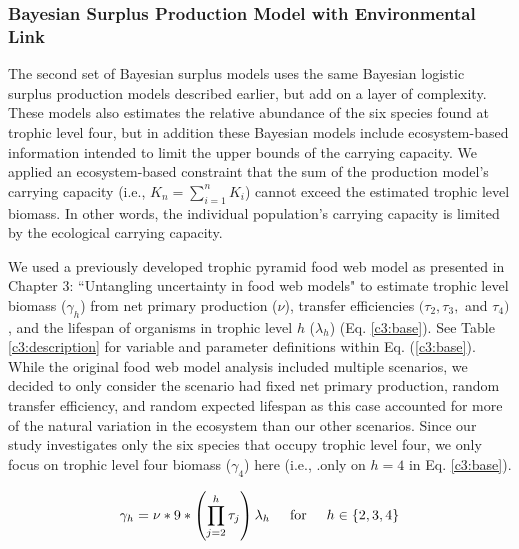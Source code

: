 \documentclass[oneside,12pt,final]{sty/ucthesis-CA2012}
\begin{document}
\begin{mainmatter}
\subsubsection{Bayesian Surplus Production Model with Environmental Link}
The second set of Bayesian surplus models uses the same Bayesian logistic surplus production models described earlier, but add on a layer of complexity. These models also estimates the relative abundance of the six species found at trophic level four, but in addition these Bayesian models include ecosystem-based information intended to limit the upper bounds of the carrying capacity. We applied an ecosystem-based constraint that the sum of the production model's carrying capacity (i.e., $K_n = \sum_{i=1}^{n} K_i$) cannot exceed the estimated trophic level biomass. In other words, the individual population's carrying capacity is limited by the ecological carrying capacity.

\vspace{5mm}

We used a previously developed trophic pyramid food web model as presented in Chapter 3: ``Untangling uncertainty in food web models" to estimate trophic level biomass ($\gamma_h$) from net primary production ($\nu$), transfer efficiencies $(\tau_2, \tau_3,$ and $\tau_4)$, and the lifespan of organisms in trophic level $h$ ($\lambda_h$) (Eq. \ref{c3:base}). See Table \ref{c3:description} for variable and parameter definitions within Eq. (\ref{c3:base}). While the original food web model analysis included multiple scenarios, we decided to only consider the scenario had fixed net primary production, random transfer efficiency, and random expected lifespan as this case accounted for more of the natural variation in the ecosystem than our other scenarios. Since our study investigates only the six species that occupy trophic level four, we only focus on trophic level four biomass ($\gamma_4$) here (i.e., .only on $h=4$ in Eq. \ref{c3:base}).

\begin{equation} \label{c3:base}
\gamma_h = \nu * 9 * \left( \prod_{j=2}^{h} \tau_j \right) \lambda_h \hspace{5mm} \text{for} \hspace{5mm} h \in \{2, 3, 4\}
\end{equation}


\end{mainmatter}
\end{document}
